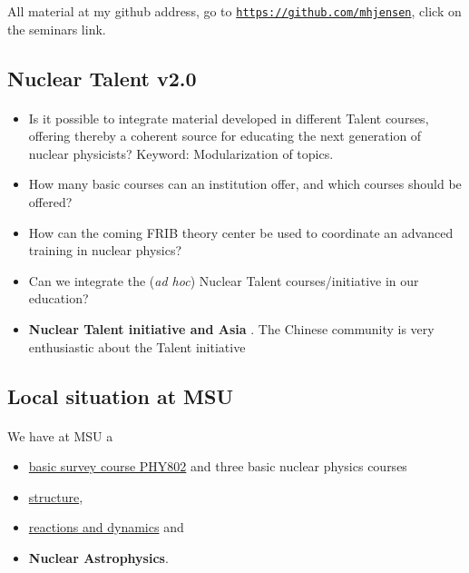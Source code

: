 \documentclass[%
twoside,                 %
final,                   %
10pt]{article}
\begin{document}
\noindent
All material at my github address, go to \href{{https://github.com/mhjensen}}{\nolinkurl{https://github.com/mhjensen}}, click on the seminars link.



\subsection*{Nuclear Talent v2.0}

\paragraph{}
\begin{itemize}
\item Is it possible to integrate material developed in different Talent courses, offering thereby a coherent source for educating the next generation of nuclear physicists? Keyword: Modularization of topics.

\item How many basic courses can an institution offer, and which courses should be offered?

\item How can the coming FRIB theory center be used to coordinate an advanced training in nuclear physics?

\item Can we integrate the (\emph{ad hoc}) Nuclear Talent courses/initiative  in our education? 

\item \textbf{Nuclear Talent initiative and Asia} . The Chinese community is very enthusiastic about the Talent initiative
\end{itemize}

\noindent




\subsection*{Local situation at MSU}

\paragraph{}

We have at MSU a  
\begin{itemize}
\item \href{{https://people.nscl.msu.edu/~witek/Classes/PHY802/NuclPhys802-2015.html}}{basic survey course PHY802}  and three basic nuclear physics courses 

\item \href{{http://nuclearstructure.github.io/PHY981/doc/web/course.html}}{structure}, 

\item \href{{https://people.nscl.msu.edu/~nunes/phy982/phy982web2015.htm}}{reactions and dynamics}  and 

\item \textbf{Nuclear Astrophysics}. 
\end{itemize}
\end{document}
